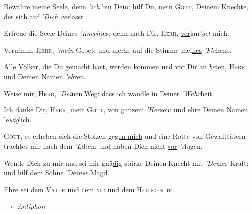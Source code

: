 \begin{multicols}{2}\setlength{\columnseprule}{0.2pt}
Bewahre meine Seele, denn \emph{'ich} bin Dein: \grestar{} hilf Du, mein \textsc{Gott}, Deinem Knechte, der sich \underline{auf} \emph{'Dich ver}lässt.\par
 Erfreue die Seele Deines \emph{'Knech}tes: \grestar{} denn nach Dir, \textsc{Herr}, \underline{ver}lan\emph{'get} mich.\par
 Vernimm, \textsc{Herr}, \emph{'mein} Gebet: \grestar{} und merke auf die Stimme mei\underline{nes} \emph{'Fle}hens.\par
 Alle Völker, die Du gemacht hast, werden kommen und vor Dir an\emph{'be}ten, \textsc{Herr}: \grestar{} und Deinen Na\underline{men} \emph{'eh}ren.\par
 Weise mir, \textsc{Herr}, \emph{'Dei}nen Weg: \grestar{} dass ich wandle in Dei\underline{ner} \emph{'Wahr}heit.\par
 Ich danke Dir, \textsc{Herr}, mein \textsc{Gott}, von ganzem \emph{'Her}zen: \grestar{} und ehre Deinen Na\underline{men} 'e\emph{wig}lich.\par
 \textsc{Gott}, es erheben sich die Stolzen ge\underline{gen mich} \gredagger{} und eine Rotte von Gewalttätern trachtet mir nach dem \emph{'Le}ben: \grestar{} und haben Dich nicht \underline{vor} \emph{'Au}gen.\par
 Wende Dich zu mir und sei mir gnä\underline{dig} \gredagger{} stärke Deinen Knecht mit \emph{'Dei}ner Kraft: \grestar{} und hilf dem Soh\underline{ne} 'Dei\emph{ner} Magd.\par
 Ehre sei dem \textsc{Vater} und dem \textsc{ne:} \grestar{} und dem \textsc{Heili\underline{gen}} \textsc{te}.\par
  \textit{$\rightarrow$ Antiphon}
\end{multicols}
